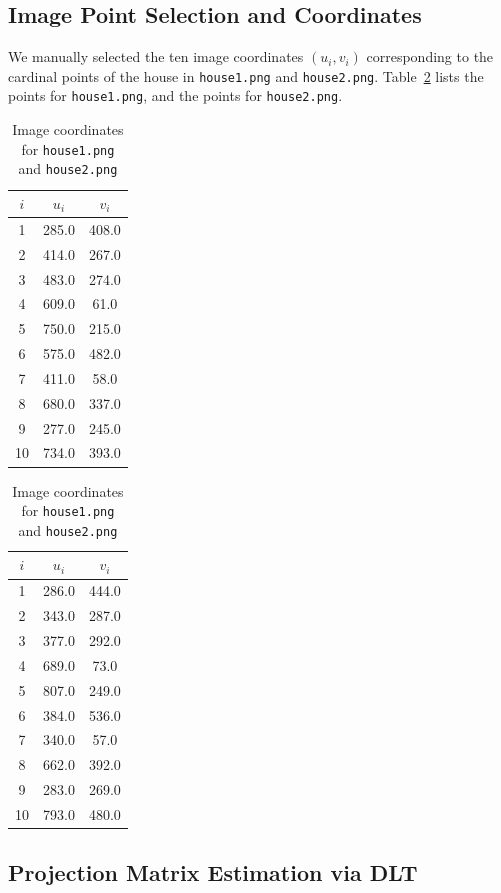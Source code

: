 \subsection{Image Point Selection and Coordinates}
We manually selected the ten image coordinates $(u_i,v_i)$ corresponding to the cardinal points of the house in \texttt{house1.png} and \texttt{house2.png}. Table~\ref{tab:imgpts2} lists the points for \texttt{house1.png}, and the points for \texttt{house2.png}.

\begin{table}[H]
  \centering
  \begin{tabular}{c|cc}
    $i$ & $u_i$ & $v_i$ \\
    \hline
    1 & 285.0 & 408.0 \\
    2 & 414.0 & 267.0 \\
    3 & 483.0 & 274.0 \\
    4 & 609.0 & 61.0  \\
    5 & 750.0 & 215.0 \\
    6 & 575.0 & 482.0 \\
    7 & 411.0 & 58.0  \\
    8 & 680.0 & 337.0 \\
    9 & 277.0 & 245.0 \\
    10 & 734.0 & 393.0\\
\end{tabular}
\hspace{2cm}
\begin{tabular}{c|cc}
    $i$ & $u_i$ & $v_i$ \\
    \hline
    1 & 286.0 & 444.0 \\
    2 & 343.0 & 287.0 \\
    3 & 377.0 & 292.0 \\
    4 & 689.0 & 73.0  \\
    5 & 807.0 & 249.0 \\
    6 & 384.0 & 536.0 \\
    7 & 340.0 & 57.0  \\
    8 & 662.0 & 392.0 \\
    9 & 283.0 & 269.0 \\
    10 & 793.0 & 480.0\\
\end{tabular}
\caption{Image coordinates for \texttt{house1.png} and \texttt{house2.png}}
\label{tab:imgpts2}
\end{table}

\subsection{Projection Matrix Estimation via DLT}

